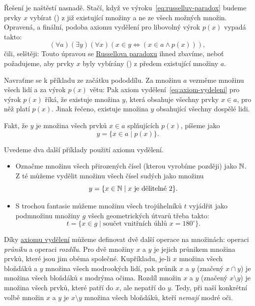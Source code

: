 Řešení je naštěstí nasnadě. Stačí, když ve výroku~\eqref{eq:russelluv-paradox}
budeme prvky $x$ vybírat () z již existující množiny a ne ze všech
možných množin. Opravená, a finální, podoba axiomu vydělení pro libovolný výrok
$p(x)$ vypadá takto:
\begin{equation}
  \label{eq:axiom-vydeleni}
  ( \forall a)( \exists y)( \forall x)(x \in y \Leftrightarrow (x \in a \wedge
  p(x))),
\end{equation}
čili, selštěji:  Touto úpravou se
\hyperref[exam:russelluv-paradox]{Russellova paradoxu} ihned zbavíme, neboť
požadujeme, aby prvky $x$ byly vybírány () z předem existující
množiny $a$.

\begin{example}
  \label{exam:axiom-vydeleni}
  Navraťme se k příkladu ze začátku pododdílu. Za množinu $a$ vezměme množinu
  všech lidí a za výrok $p(x)$ větu:  Pak axiom
  vydělení~\eqref{eq:axiom-vydeleni} pro výrok $p(x)$ říká, že existuje množina
  $y$, která obsahuje všechny prvky $x \in a$, pro něž platí $p(x)$. Jinak
  řečeno, existuje množina $y$ obsahující všechny dospělé lidi.
\end{example}
\begin{notation}
  Fakt, že $y$ je množina všech prvků $x \in a$ splňujících $p(x)$, píšeme jako
  \[
    y = \{x \in a \mid p(x)\}.
  \]
\end{notation}
\begin{example}
  \label{exam:axiom-vydeleni-2}
  Uvedeme dva další příklady použití axiomu vydělení.
  \begin{itemize}
    \item Označme množinu všech přirozených čísel (kterou vyrobíme později) jako
      $\mathbb{N}$. Z té můžeme vydělit množinu všech čísel sudých jako množinu
      \[
        y = \{x \in \mathbb{N} \mid x \text{ je dělitelné } 2\}.
      \]
    \item S trochou fantasie můžeme množinu všech trojúhelníků $t$ vyjádřit jako
      podmnožinu množiny $g$ všech geometrických útvarů třeba takto:
      \[
        t = \{x \in g \mid \text{součet vnitřních úhlů } x = 180^{ \circ }\}.
      \]
  \end{itemize}
\end{example}

Díky \hyperref[eq:axiom-vydeleni]{axiomu vydělení} můžeme definovat dvě další
operace na množinách: operaci \emph{průniku} a operaci \emph{rozdílu}. Pro dvě
množiny $x$ a $y$ je jejich průnikem množina prvků, které jsou jim oběma
společné. Kupříkladu, je-li $x$ množina všech bloňdáků a $y$ množina všech
modrookých lidí, pak průnik $x$ a $y$ (značený $x \cap y$) je množina všech
bloňdáků s modrýma očima. Rozdíl množin $x$ a $y$ (značený $x \setminus y$) je
množina všech prvků, které patří do $x$, ale nepatří do $y$. Tedy, při naší
konkrétní volbě množin $x$ a $y$ je $x \setminus y$ množina všech bloňdáků,
kteří \emph{nemají} modré oči.

